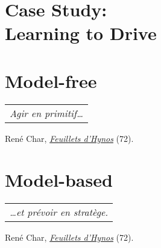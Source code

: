 


\part[Case Study: Learning to Drive]{Case Study:\\Learning to Drive}
\label{part:1}




\part{Model-free}
\label{part:2}

\vspace*{2cm}
\begin{flushright}
	\begin{tabular}{@{}l@{}}
		\emph{Agir en primitif\dots}\\
	\end{tabular}
	
	René Char, \href{https://eleurent.github.io/sisyphe/texts/feuillets-d-hypnos.html}{\emph{Feuillets d'Hynos}} {\small (72)}.
\end{flushright}




\part{Model-based}
\label{part:3}

\vspace*{2cm}
\begin{flushright}
	\begin{tabular}{@{}l@{}}
		\emph{\dots et prévoir en stratège.}\\
	\end{tabular}
	
	René Char, \href{https://eleurent.github.io/sisyphe/texts/feuillets-d-hypnos.html}{\emph{Feuillets d'Hynos}} {\small (72)}.
\end{flushright}




